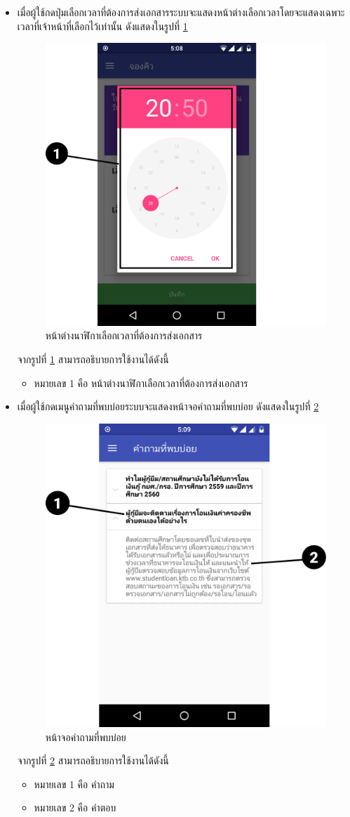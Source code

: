 \begin{enumerate}
\begin{itemize}
			\item เมื่อผู้ใช้กดปุ่มเลือกเวลาที่ต้องการส่งเอกสารระบบจะแสดงหน้าต่างเลือกเวลาโดยจะแสดงเฉพาะเวลาที่เจ้าหน้าที่เลือกไว้เท่านั้น ดังแสดงในรูปที่ \ref{Fig:time}
			\begin{figure}[H]
				\centering
				\includegraphics[width=0.5\columnwidth]{Figures/7/Manual/time}
				\caption{หน้าต่างนาฬิกาเลือกเวลาที่ต้องการส่งเอกสาร}
				\label{Fig:time}
			\end{figure}
			จากรูปที่ \ref{Fig:time} สามารถอธิบายการใช้งานได้ดังนี้
			\begin{itemize}[label={--}]
				\item หมายเลข 1 คือ หน้าต่างนาฬิกาเลือกเวลาที่ต้องการส่งเอกสาร 
			\end{itemize}  
		
			\item เมื่อผู้ใช้กดเมนูคำถามที่พบบ่อยระบบจะแสดงหน้าจอคำถามที่พบบ่อย ดังแสดงในรูปที่ \ref{Fig:faq2}
			\begin{figure}[H]
				\centering
				\includegraphics[width=0.5\columnwidth]{Figures/7/Manual/faq2}
				\caption{หน้าจอคำถามที่พบบ่อย}
				\label{Fig:faq2}
			\end{figure}
			จากรูปที่ \ref{Fig:faq2} สามารถอธิบายการใช้งานได้ดังนี้
			\begin{itemize}[label={--}]
				\item หมายเลข 1 คือ คำถาม
				\item หมายเลข 2 คือ คำตอบ
			\end{itemize}  
	

\end{itemize}
\end{enumerate}
